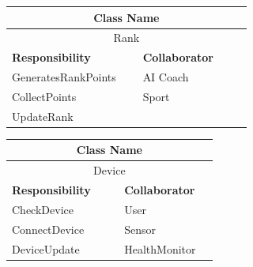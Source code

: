 \documentclass[a4paper]{article}
\begin{document}
	\noindent\begin{minipage}{\textwidth}
		\begin{minipage}[t]{0.48\textwidth}
	 	\centering
		\makeatletter{}\makeatother\caption*{}
		  	\begin{tabular}{|p{0.48\linewidth}|p{0.40\linewidth}|} 
	   			\hline
				\multicolumn{2}{|c|}{\textbf{Class Name}} \\
				\hline
				\multicolumn{2}{|c|}{Rank} \\
				\hline
				\textbf{Responsibility} & \textbf{Collaborator} \\
				\hline
				GeneratesRankPoints & AI Coach\\
				CollectPoints & Sport\\
				UpdateRank & \\
				\hline
	   		\end{tabular}
	 	\end{minipage}
	 	\begin{minipage}[t]{0.48\textwidth}
		\centering
		\makeatletter{}\makeatother\caption*{}
			\begin{tabular}{|p{0.48\linewidth}|p{0.40\linewidth}|} 
				\hline
				\multicolumn{2}{|c|}{\textbf{Class Name}} \\
				\hline
				\multicolumn{2}{|c|}{Device} \\
				\hline
				\textbf{Responsibility} & \textbf{Collaborator} \\
				\hline
				CheckDevice & User\\
				ConnectDevice & Sensor\\
				DeviceUpdate & HealthMonitor\\
				\hline
			\end{tabular}
		\end{minipage}
   	\end{minipage}
\end{document}

